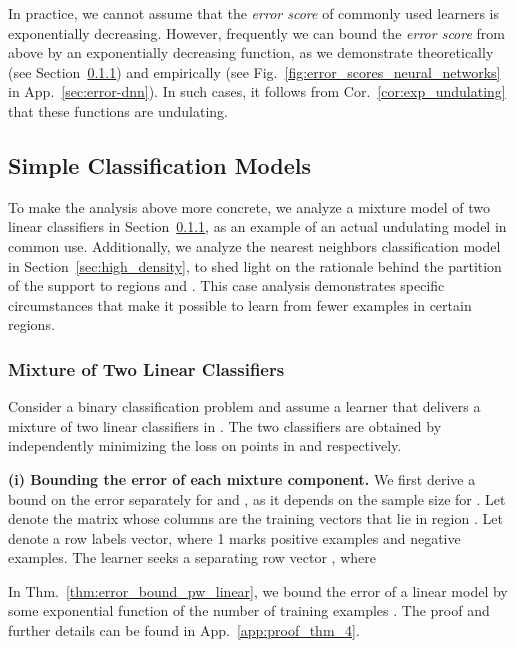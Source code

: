 \documentclass{article}
\newcommand{\myparagraph}[1]{\smallskip\noindent\textbf{#1}}
\newcommand{\app}{App.}
\begin{document}
In practice, we cannot assume that the \emph{error score} of commonly used learners is exponentially decreasing. However, frequently we can bound the \emph{error score} from above by an exponentially decreasing function, as we demonstrate theoretically (see Section~\ref{sec:piecewise_linear_separator}) and empirically (see Fig.~\ref{fig:error_scores_neural_networks} in \app~\ref{sec:error-dnn}). In such cases, it follows from Cor.~\ref{cor:exp_undulating} that these functions are undulating.  






\subsection{Simple Classification Models}
\label{sec:common}

To make the analysis above more concrete, we analyze a mixture model of two linear classifiers in Section~\ref{sec:piecewise_linear_separator}, as an example of an actual undulating model in common use. Additionally, we analyze the nearest neighbors classification model in Section~\ref{sec:high_density}, to shed light on the rationale behind the partition of the support to regions  and . This case analysis demonstrates specific circumstances that make it possible to learn from fewer examples in certain regions.

\subsubsection{Mixture of Two Linear Classifiers}
\label{sec:piecewise_linear_separator}

Consider a binary classification problem and assume a learner that delivers a mixture of two linear classifiers in . The two classifiers are obtained by independently minimizing the  loss on points in  and  respectively. 

\myparagraph{(i) Bounding the error of each mixture component.}
We first derive a bound on the error separately for  and , as it depends on the sample size  for . Let  denote the matrix whose columns are the training vectors that lie in region . Let  denote a row labels vector, where 1 marks positive examples and  negative examples. The learner seeks a separating row vector , where


In Thm.~\ref{thm:error_bound_pw_linear}, we bound the error of a linear model by some exponential function of the number of training examples . The proof and further details can be found in \app~\ref{app:proof_thm_4}.
\end{document}
